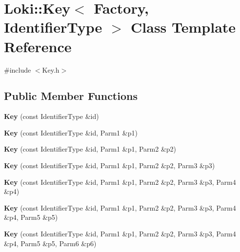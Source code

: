 \hypertarget{classLoki_1_1Key}{}\section{Loki\+:\+:Key$<$ Factory, Identifier\+Type $>$ Class Template Reference}
\label{classLoki_1_1Key}


{\ttfamily \#include $<$Key.\+h$>$}

\subsection*{Public Member Functions}
\begin{DoxyCompactItemize}
\item 
\hypertarget{classLoki_1_1Key_a92300486498558d3f231fbad014d2e31}{}{\bfseries Key} (const Identifier\+Type \&id)\label{classLoki_1_1Key_a92300486498558d3f231fbad014d2e31}

\item 
\hypertarget{classLoki_1_1Key_a67146ffa1fcb1136b0b4eaa4ee271861}{}{\bfseries Key} (const Identifier\+Type \&id, Parm1 \&p1)\label{classLoki_1_1Key_a67146ffa1fcb1136b0b4eaa4ee271861}

\item 
\hypertarget{classLoki_1_1Key_aa3f55e1d87e3386177fc0ca675571796}{}{\bfseries Key} (const Identifier\+Type \&id, Parm1 \&p1, Parm2 \&p2)\label{classLoki_1_1Key_aa3f55e1d87e3386177fc0ca675571796}

\item 
\hypertarget{classLoki_1_1Key_a29101400c809b7cbb2cc3629c0a80f2b}{}{\bfseries Key} (const Identifier\+Type \&id, Parm1 \&p1, Parm2 \&p2, Parm3 \&p3)\label{classLoki_1_1Key_a29101400c809b7cbb2cc3629c0a80f2b}

\item 
\hypertarget{classLoki_1_1Key_a8d7a4a0a20762970bc95875cdbde4d64}{}{\bfseries Key} (const Identifier\+Type \&id, Parm1 \&p1, Parm2 \&p2, Parm3 \&p3, Parm4 \&p4)\label{classLoki_1_1Key_a8d7a4a0a20762970bc95875cdbde4d64}

\item 
\hypertarget{classLoki_1_1Key_a5f803aebab706367e9ac10b4efb60295}{}{\bfseries Key} (const Identifier\+Type \&id, Parm1 \&p1, Parm2 \&p2, Parm3 \&p3, Parm4 \&p4, Parm5 \&p5)\label{classLoki_1_1Key_a5f803aebab706367e9ac10b4efb60295}

\item 
\hypertarget{classLoki_1_1Key_ac96ba95b65e1dfb41c42358783b8172e}{}{\bfseries Key} (const Identifier\+Type \&id, Parm1 \&p1, Parm2 \&p2, Parm3 \&p3, Parm4 \&p4, Parm5 \&p5, Parm6 \&p6)\label{classLoki_1_1Key_ac96ba95b65e1dfb41c42358783b8172e}


\end{DoxyCompactItemize}
